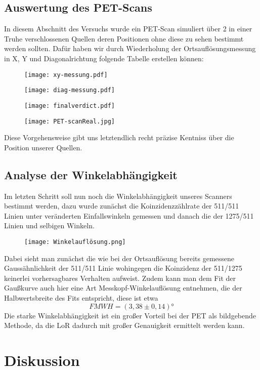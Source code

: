 \documentclass{article}
\begin{document}
        \subsection{Auswertung des PET-Scans}
            In diesem Abschnitt des Versuchs wurde ein PET-Scan simuliert über 2 in einer Truhe verschlossenen Quellen deren Positionen ohne diese zu sehen
            bestimmt werden sollten. Dafür haben wir durch Wiederholung der Ortsauflösungsmessung in X, Y und Diagonalrichtung folgende Tabelle erstellen können:
            \begin{figure}[H]
                \centering
                \texttt{[image: xy-messung.pdf]}
                \label{Tabelle der Messungen in X und Y Richtung}
            \end{figure}
            \begin{figure}[H]
                \centering
                \texttt{[image: diag-messung.pdf]}
                \label{Tabelle der Messungen in Diagonalrichtung}
            \end{figure}
            \begin{figure}[H]
                \centering
                \texttt{[image: finalverdict.pdf]}
                \label{Überlagerung beider Messungen und Position der Quellen}
            \end{figure}
            \begin{figure}[H]
                \centering
                \texttt{[image: PET-scanReal.jpg]}
                \label{Tatsächliche Position der Quellen}
            \end{figure}
            Diese Vorgehensweise gibt uns letztendlich recht präzise Kentniss über die Position unserer Quellen.



        \subsection{Analyse der Winkelabhängigkeit}
            Im letzten Schritt soll nun noch die Winkelabhängigkeit unseres Scanners bestimmt werden, dazu wurde zunächst die Koinzidenzzählrate
            der 511/511 Linien unter veränderten Einfallswinkeln gemessen und danach die der 1275/511 Linien und selbigen Winkeln.
            \begin{figure}[H]
                \centering
                \texttt{[image: Winkelauflösung.png]}
                \label{Winkelauflösung}
            \end{figure}
            Dabei sieht man zunächst die wie bei der Ortsauflösung bereits gemessene Gaussähnlichkeit der 511/511 Linie wohingegen die 
            Koinzidenz der 511/1275 keinerlei vorhersagbares Verhalten aufweist. Zudem kann man dem Fit der Gaußkurve auch hier eine 
            Art Messkopf-Winkelauflösung entnehmen, die der Halbwertsbreite des Fits entspricht, diese ist etwa $$FMWH=(3,38\pm 0,14)°$$
            Die starke Winkelabhängigkeit ist ein großer Vorteil bei der PET als bildgebende Methode, da die LoR dadurch mit großer Genauigkeit
            ermittelt werden kann.
            
    \section{Diskussion}
\end{document}
